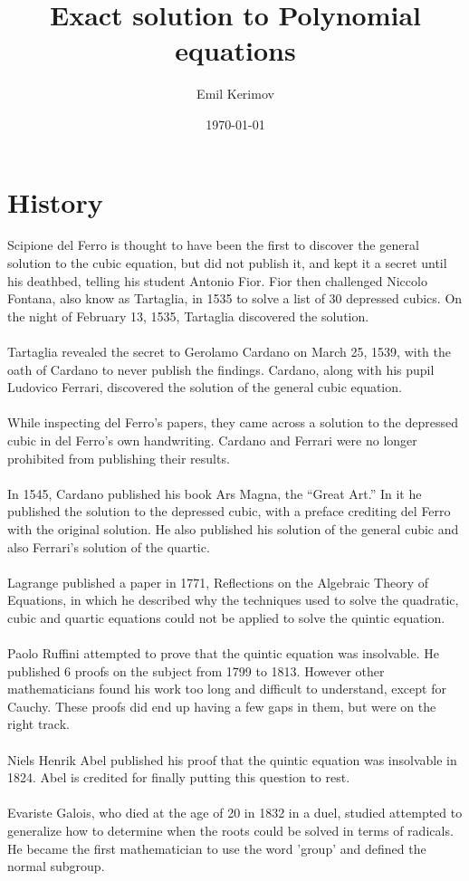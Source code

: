 \documentclass[a4paper]{article}
\title{Exact solution to Polynomial equations}
\author{Emil Kerimov}
\date{\today}
\begin{document}
\maketitle

\newtheorem{theorem}{Theorem}[section]
\newtheorem{corollary}{Corollary}[theorem]
\newtheorem{lemma}[theorem]{Lemma}
\newtheorem{definition}{Definition}[section]

\section{History}

Scipione del Ferro is thought to have been the first to discover the general solution to the cubic equation, but did not publish it, and kept it a secret until his deathbed, telling his student Antonio Fior.
Fior then challenged Niccolo Fontana, also know as
Tartaglia, in 1535 to solve a list of 30
depressed cubics. On the night of February 13, 1535,
Tartaglia discovered the solution.
\\
\\
Tartaglia revealed the secret to
Gerolamo Cardano on March 25, 1539, with the oath
of Cardano to never publish the findings. Cardano, along with his pupil Ludovico Ferrari, discovered the solution of the
general cubic equation. 
\\
\\
While inspecting del Ferro’s papers, they
came across a solution to the depressed
cubic in del Ferro’s own handwriting. Cardano and Ferrari were no longer
prohibited from publishing their results.
\\
\\
In 1545, Cardano published his book Ars
Magna, the “Great Art.”
In it he published the solution to the
depressed cubic, with a preface crediting
del Ferro with the original solution.
He also published his solution of the
general cubic and also Ferrari’s solution of
the quartic.
\\
\\
Lagrange published a paper in 1771, Reflections on the Algebraic Theory of Equations, in which he described why the techniques used to solve the quadratic, cubic and quartic equations could not be applied to solve the quintic equation. 
\\
\\
Paolo Ruffini attempted to prove that the quintic equation was insolvable. He published 6 proofs on the subject from 1799 to 1813. However other mathematicians found his work too long and difficult to understand, except for Cauchy. These proofs did end up having a few gaps in them, but were on the right track. 
\\
\\
Niels Henrik Abel published his proof that the quintic equation was insolvable in 1824. Abel is credited for finally putting this question to rest. 
\\
\\
Evariste Galois, who died at the age of 20 in 1832 in a duel, studied attempted to generalize how to determine when the roots could be solved in terms of radicals. He became the first mathematician to use the word 'group' and defined the normal subgroup.
\end{document}
